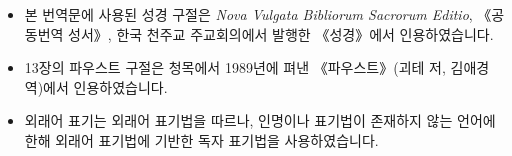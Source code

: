 {\hspace*{1em}\large{}}

\begin{itemize}

\item 본 번역문에 사용된 성경 구절은 \textit{Nova Vulgata Bibliorum Sacrorum Editio}, 《공동번역 성서》, 한국 천주교 주교회의에서 발행한 《성경》에서 인용하였습니다.
\item 13장의 파우스트 구절은 청목에서 1989년에 펴낸 《파우스트》(괴테 저, 김애경 역)에서 인용하였습니다.
\item 외래어 표기는 외래어 표기법을 따르나, 인명이나 표기법이 존재하지 않는 언어에 한해 외래어 표기법에 기반한 독자 표기법을 사용하였습니다.

\end{itemize}
